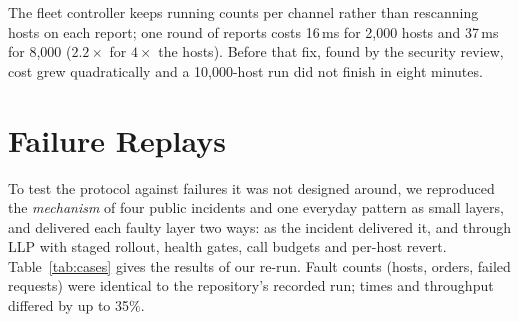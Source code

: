 \documentclass[10pt,twocolumn]{article}
\newcommand{\ms}{\,ms\xspace}
\begin{document}
The fleet controller keeps running counts per channel rather than rescanning hosts on each report;
one round of reports costs 16\ms for 2{,}000 hosts and 37\ms for 8{,}000 ($2.2\times$ for
$4\times$ the hosts). Before that fix, found by the security review, cost grew quadratically and a
10{,}000-host run did not finish in eight minutes.

\section{Failure Replays}
\label{sec:cases}

To test the protocol against failures it was not designed around, we reproduced the
\emph{mechanism} of four public incidents and one everyday pattern as small layers, and delivered
each faulty layer two ways: as the incident delivered it, and through LLP with staged rollout,
health gates, call budgets and per-host revert. Table~\ref{tab:cases} gives the results of our
re-run. Fault counts (hosts, orders, failed requests) were identical to the repository's recorded
run; times and throughput differed by up to 35\%.
\end{document}
